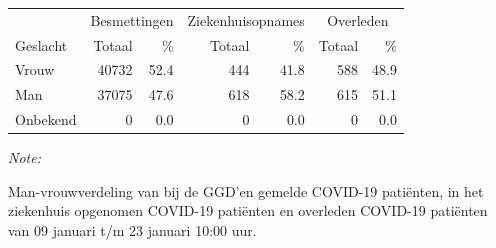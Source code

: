\documentclass[
  english,
  man,floatsintext]{apa6}
\begin{document}
\begin{table}[H]
\centering\begingroup\fontsize{11}{13}\selectfont

\begin{threeparttable}
\begin{tabular}{lrrrrrr}
\toprule
\multicolumn{1}{c}{ } & \multicolumn{2}{c}{Besmettingen} & \multicolumn{2}{c}{Ziekenhuisopnames} & \multicolumn{2}{c}{Overleden} \\
\cmidrule(l{3pt}r{3pt}){2-3} \cmidrule(l{3pt}r{3pt}){4-5} \cmidrule(l{3pt}r{3pt}){6-7}
Geslacht & Totaal & \% & Totaal & \% & Totaal & \%\\
\midrule
Vrouw & 40732 & 52.4 & 444 & 41.8 & 588 & 48.9\\
Man & 37075 & 47.6 & 618 & 58.2 & 615 & 51.1\\
Onbekend & 0 & 0.0 & 0 & 0.0 & 0 & 0.0\\
\bottomrule
\end{tabular}
\begin{tablenotes}
\item \textit{Note: } 
\item Man-vrouwverdeling van bij de GGD’en gemelde COVID-19 patiënten, in het ziekenhuis opgenomen COVID-19 patiënten en overleden COVID-19 patiënten van 09 januari t/m 23 januari 10:00 uur.
\end{tablenotes}
\end{threeparttable}
\endgroup{}
\end{table}
\newpage
\end{document}
